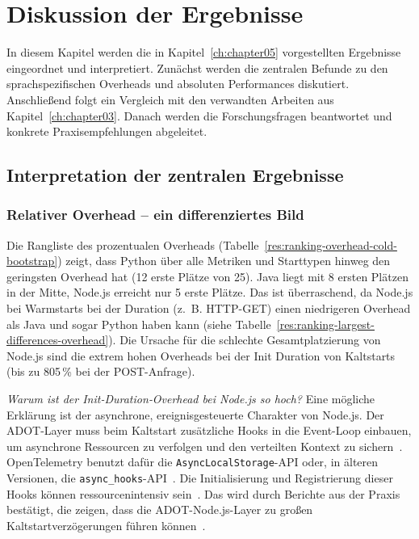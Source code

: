 ﻿\chapter{Diskussion der Ergebnisse}
\label{ch:chapter06}

In diesem Kapitel werden die in Kapitel~\ref{ch:chapter05} vorgestellten Ergebnisse eingeordnet und interpretiert. 
Zunächst werden die zentralen Befunde zu den sprachspezifischen Overheads und absoluten Performances diskutiert. 
Anschließend folgt ein Vergleich mit den verwandten Arbeiten aus Kapitel~\ref{ch:chapter03}. Danach werden die Forschungsfragen 
beantwortet und konkrete Praxisempfehlungen abgeleitet.

\section{Interpretation der zentralen Ergebnisse}

\subsection{Relativer Overhead – ein differenziertes Bild}

Die Rangliste des prozentualen Overheads (Tabelle~\ref{res:ranking-overhead-cold-bootstrap}) zeigt, dass Python über alle 
Metriken und Starttypen hinweg den geringsten Overhead hat (12 erste Plätze von 25). Java liegt mit 8 ersten Plätzen in der Mitte, 
Node.js erreicht nur 5 erste Plätze. Das ist überraschend, da Node.js bei Warmstarts bei der Duration (z.~B. HTTP-GET) einen niedrigeren 
Overhead als Java und sogar Python haben kann (siehe Tabelle~\ref{res:ranking-largest-differences-overhead}). Die Ursache für die 
schlechte Gesamtplatzierung von Node.js sind die extrem hohen Overheads bei der Init Duration von Kaltstarts (bis zu 805\,\% 
bei der POST-Anfrage).

\emph{Warum ist der Init‑Duration‑Overhead bei Node.js so hoch?} 
Eine mögliche Erklärung ist der asynchrone, ereignisgesteuerte Charakter von Node.js. Der ADOT-Layer muss beim Kaltstart zusätzliche 
Hooks in die Event-Loop einbauen, um asynchrone Ressourcen zu verfolgen und den verteilten Kontext zu sichern~\cite{OTelNodeAsyncHooks}. 
OpenTelemetry benutzt dafür die \texttt{AsyncLocalStorage}-API oder, in älteren Versionen, die \texttt{async\_hooks}-API~\cite{OTelNodeAsyncHooks}. 
Die Initialisierung und Registrierung dieser Hooks können ressourcenintensiv sein~\cite{RaphaelMankeOTelESM}. 
Das wird durch Berichte aus der Praxis bestätigt, die zeigen, dass die ADOT-Node.js-Layer zu großen 
Kaltstartverzögerungen führen können~\cite{OTelLambdaColdStartIssue, AWSADOTLayerIssue}.

